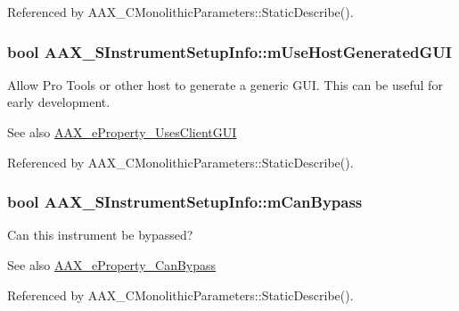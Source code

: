 Referenced by A\+A\+X\+\_\+\+C\+Monolithic\+Parameters\+::\+Static\+Describe().

\hypertarget{a00124_a38bf1193daf9ebd4b0643dec21507caa}{}
\subsubsection[{m\+Use\+Host\+Generated\+G\+U\+I}]{\setlength{\rightskip}{0pt plus 5cm}bool A\+A\+X\+\_\+\+S\+Instrument\+Setup\+Info\+::m\+Use\+Host\+Generated\+G\+U\+I}\label{a00124_a38bf1193daf9ebd4b0643dec21507caa}


Allow Pro Tools or other host to generate a generic G\+U\+I. This can be useful for early development. 

\begin{DoxySeeAlso}{See also}
\hyperlink{a00283_a6571f4e41a5dd06e4067249228e2249eaf48412738dcfcc56046718d9e5a034d7}{A\+A\+X\+\_\+e\+Property\+\_\+\+Uses\+Client\+G\+U\+I} 
\end{DoxySeeAlso}


Referenced by A\+A\+X\+\_\+\+C\+Monolithic\+Parameters\+::\+Static\+Describe().

\hypertarget{a00124_a849b67e9badf7ca38a506f8010d4fff1}{}
\subsubsection[{m\+Can\+Bypass}]{\setlength{\rightskip}{0pt plus 5cm}bool A\+A\+X\+\_\+\+S\+Instrument\+Setup\+Info\+::m\+Can\+Bypass}\label{a00124_a849b67e9badf7ca38a506f8010d4fff1}


Can this instrument be bypassed? 

\begin{DoxySeeAlso}{See also}
\hyperlink{a00283_a6571f4e41a5dd06e4067249228e2249ea6819867a9e86913e59decf318416d755}{A\+A\+X\+\_\+e\+Property\+\_\+\+Can\+Bypass} 
\end{DoxySeeAlso}


Referenced by A\+A\+X\+\_\+\+C\+Monolithic\+Parameters\+::\+Static\+Describe().

